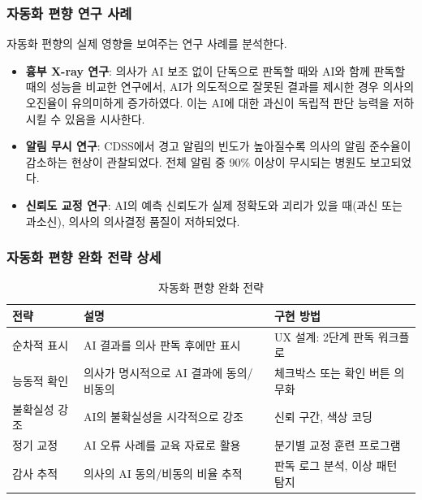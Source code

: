 \subsubsection{자동화 편향 연구 사례}

자동화 편향의 실제 영향을 보여주는 연구 사례를 분석한다.

\begin{itemize}
 \item \textbf{흉부 X-ray 연구}: 의사가 AI 보조 없이 단독으로 판독할 때와 AI와 함께 판독할 때의 성능을 비교한 연구에서, AI가 의도적으로 잘못된 결과를 제시한 경우 의사의 오진율이 유의미하게 증가하였다. 이는 AI에 대한 과신이 독립적 판단 능력을 저하시킬 수 있음을 시사한다.
 \item \textbf{알림 무시 연구}: CDSS\cite{wiens2019do}에서 경고 알림의 빈도가 높아질수록 의사의 알림 준수율이 감소하는 현상이 관찰되었다. 전체 알림 중 90\% 이상이 무시되는 병원도 보고되었다.
 \item \textbf{신뢰도 교정 연구}: AI의 예측 신뢰도가 실제 정확도와 괴리가 있을 때(과신 또는 과소신), 의사의 의사결정 품질이 저하되었다.
\end{itemize}

\subsubsection{자동화 편향 완화 전략 상세}

\begin{table}[htbp]
\centering
\caption{자동화 편향 완화 전략}
\label{tab:16_automation_bias}
\begin{tabularx}{\textwidth}{p{2.5cm}Xp{4cm}}
\toprule
\textbf{전략} & \textbf{설명} & \textbf{구현 방법} \\
\midrule
순차적 표시 & AI 결과를 의사 판독 후에만 표시 & UX 설계: 2단계 판독 워크플로 \\
능동적 확인 & 의사가 명시적으로 AI 결과에 동의/비동의 & 체크박스 또는 확인 버튼 의무화 \\
불확실성 강조 & AI의 불확실성을 시각적으로 강조 & 신뢰 구간, 색상 코딩 \\
정기 교정 & AI 오류 사례를 교육 자료로 활용 & 분기별 교정 훈련 프로그램 \\
감사 추적 & 의사의 AI 동의/비동의 비율 추적 & 판독 로그 분석, 이상 패턴 탐지 \\
\bottomrule
\end{tabularx}
\end{table}

